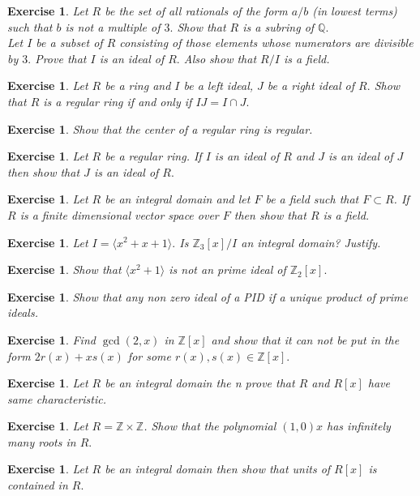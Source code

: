\documentclass[11pt]{amsart}
\newtheorem{ex}[theorem]{Exercise}
\newcommand{\QQ}{\mathbb Q}
\newcommand{\ZZ}{\mathbb Z}
\newcommand{\gen}[1]{\langle#1\rangle}
\begin{document}
\begin{ex}
Let $R$ be the set of all rationals of the form $a/b$ (in lowest terms) such that $b$ is not a multiple of $3.$ Show that $R$ is a subring of ${\QQ}.$\\
Let $I$ be a subset of $R$ consisting of those elements whose numerators are divisible by $3.$ Prove that $I$ is an ideal of $R.$ Also show that $R/I$ is a field.
\end{ex}
\begin{ex}
Let $R$ be a ring and $I$ be a left ideal, $J$ be a right ideal of $R.$ Show that $R$ is a regular ring if and only if $IJ=I\cap J.$
\end{ex}
\begin{ex}
Show that the center of a regular ring is regular.
\end{ex}
\begin{ex}
Let $R$ be a regular ring. If $I$ is an ideal of $R$ and $J$ is an ideal of $J$ then show that $J$ is an ideal of $R.$
\end{ex}
\begin{ex}
Let $R$ be an integral domain and let $F$ be a field such that $F\subset R$. If $R$ is a finite dimensional vector space over $F$ then show that $R$ is a field.
\end{ex}
\begin{ex}
Let $I=\gen{x^2+x+1}.$ Is ${\ZZ}_3[x]/I$ an integral domain? Justify.
\end{ex}
\begin{ex}
Show that $\gen{x^2+1}$ is not an prime ideal of ${\ZZ}_2[x].$
\end{ex}
\begin{ex}
Show that any non zero ideal of a PID if a unique product of prime ideals.
\end{ex}
\begin{ex}
Find $\gcd(2,x)$ in ${\ZZ}[x]$ and show that it can not be put in the form $2r(x)+xs(x)$ for some $r(x),s(x)\in {\ZZ}[x].$
\end{ex}
\begin{ex}
Let $R$ be an integral domain the n prove that $R$ and $R[x]$ have same characteristic.
\end{ex}
\begin{ex}
Let $R={\ZZ}\times {\ZZ}$. Show that the polynomial $(1,0)x$ has infinitely many roots in $R.$
\end{ex}
\begin{ex}
Let $R$ be an integral domain then show that units of $R[x]$ is contained in $R.$
\end{ex}
\end{document}
